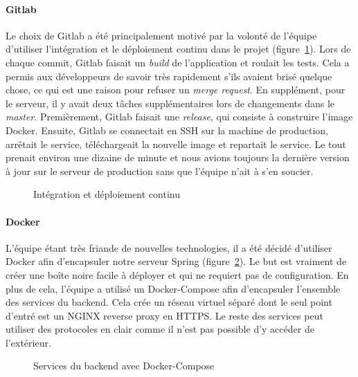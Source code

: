         \paragraph{Gitlab}
        Le choix de Gitlab a été principalement motivé par la volonté de l'équipe d'utiliser l'intégration et le déploiement continu dans le projet (figure~\ref{fig.gitlab}). Lors de chaque commit, Gitlab faisait un \emph{build} de l'application et roulait les tests. Cela a permis aux développeurs de savoir très rapidement s'ils avaient brisé quelque chose, ce qui est une raison pour refuser un \emph{merge request}. En supplément, pour le serveur, il y avait deux tâches supplémentaires lors de changements dans le \emph{master}. Premièrement, Gitlab faisait une \emph{release}, qui consiste à construire l'image Docker. Ensuite, Gitlab se connectait en SSH sur la machine de production, arrêtait le service, téléchargeait la nouvelle image et repartait le service. Le tout prenait environ une dizaine de minute et nous avions toujours la dernière version à jour sur le serveur de production sans que l'équipe n'ait à s'en soucier.
        
        \begin{figure}[hp] \centering
            
            \caption{Intégration et déploiement continu}
            \label{fig.gitlab}
        \end{figure}  
        
        \paragraph{Docker}
        L'équipe étant très friande de nouvelles technologies, il a été décidé d'utiliser Docker afin d'encapsuler notre serveur Spring (figure~\ref{fig.docker}). Le but est vraiment de créer une boîte noire facile à déployer et qui ne requiert pas de configuration. En plus de cela, l'équipe a utilisé un Docker-Compose afin d'encapsuler l'ensemble des services du backend. Cela crée un réseau virtuel séparé dont le seul point d'entré est un NGINX reverse proxy en HTTPS. Le reste des services peut utiliser des protocoles en clair comme il n'est pas possible d'y accéder de l'extérieur.

        \begin{figure}[hp] \centering
            
            \caption{Services du backend avec Docker-Compose}
            \label{fig.docker}
        \end{figure}

